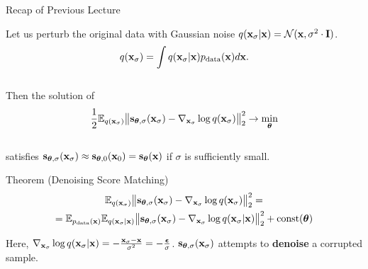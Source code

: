 \documentclass{beamer}
\begin{document}
\begin{frame}{Recap of Previous Lecture}

    Let us perturb the original data with Gaussian noise $q(\mathbf{x}_{\sigma} | \mathbf{x}) = \mathcal{N}(\mathbf{x}, \sigma^2 \cdot \mathbf{I})$.
    \vspace{-0.3cm}
    \[
        q(\mathbf{x}_{\sigma}) = \int q(\mathbf{x}_{\sigma} | \mathbf{x}) p_{\text{data}}(\mathbf{x}) d\mathbf{x}.
    \]
    \vspace{-0.6cm} \\
    Then the solution of 
    \vspace{-0.2cm}
    \[
        \frac{1}{2} \mathbb{E}_{q(\mathbf{x}_{\sigma})}\bigl\| \mathbf{s}_{\boldsymbol{\theta}, \sigma}(\mathbf{x}_{\sigma}) - \nabla_{\mathbf{x}_{\sigma}} \log q(\mathbf{x}_{\sigma}) \bigr\|^2_2 \rightarrow \min_{\boldsymbol{\theta}}
    \]
    \vspace{-0.5cm} \\
    satisfies $\mathbf{s}_{\boldsymbol{\theta}, \sigma}(\mathbf{x}_{\sigma}) \approx \mathbf{s}_{\boldsymbol{\theta}, 0}(\mathbf{x}_0) = \mathbf{s}_{\boldsymbol{\theta}}(\mathbf{x})$ if $\sigma$ is sufficiently small.
    \begin{block}{Theorem (Denoising Score Matching)}
        \vspace{-0.8cm}
        \begin{multline*}
            \mathbb{E}_{q(\mathbf{x}_{\sigma})}\bigl\| \mathbf{s}_{\boldsymbol{\theta}, \sigma}(\mathbf{x}_{\sigma}) - \nabla_{\mathbf{x}_{\sigma}} \log q(\mathbf{x}_{\sigma}) \bigr\|^2_2 = \\ = \mathbb{E}_{p_{\text{data}}(\mathbf{x})} \mathbb{E}_{q(\mathbf{x}_{\sigma} | \mathbf{x})}\bigl\| \mathbf{s}_{\boldsymbol{\theta}, \sigma}(\mathbf{x}_{\sigma}) - \nabla_{\mathbf{x}_{\sigma}} \log q(\mathbf{x}_{\sigma} | \mathbf{x}) \bigr\|^2_2 + \text{const}(\boldsymbol{\theta})
        \end{multline*}
        \vspace{-0.7cm}
    \end{block}
    Here, $\nabla_{\mathbf{x}_{\sigma}} \log q(\mathbf{x}_{\sigma} | \mathbf{x}) = - \frac{\mathbf{x}_{\sigma} - \mathbf{x}}{\sigma^2} = - \frac{\boldsymbol{\epsilon}}{\sigma}$. $\mathbf{s}_{\boldsymbol{\theta}, \sigma}(\mathbf{x}_{\sigma})$ attempts to \textbf{denoise} a corrupted sample.
\end{frame}
\end{document}
